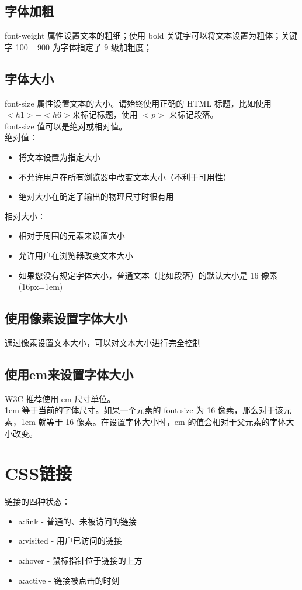 \documentclass[10pt,UTF8]{ctexart}
\begin{document}
\subsection{字体加粗}
font-weight 属性设置文本的粗细；使用 bold 关键字可以将文本设置为粗体；关键字 100 ~ 900 为字体指定了 9 级加粗度；
\subsection{字体大小}
font-size 属性设置文本的大小。请始终使用正确的 HTML 标题，比如使用 $<h1> - <h6>$来标记标题，使用 $<p>$ 来标记段落。\\
font-size 值可以是绝对或相对值。\\
绝对值：
\begin{itemize}
\item 将文本设置为指定大小
\item 不允许用户在所有浏览器中改变文本大小（不利于可用性）
\item 绝对大小在确定了输出的物理尺寸时很有用
\end{itemize}
相对大小：
\begin{itemize}
\item 相对于周围的元素来设置大小
\item 允许用户在浏览器改变文本大小
\item 如果您没有规定字体大小，普通文本（比如段落）的默认大小是 16 像素 (16px=1em)
\end{itemize}
\subsection{使用像素设置字体大小}
通过像素设置文本大小，可以对文本大小进行完全控制
\subsection{使用em来设置字体大小}
W3C 推荐使用 em 尺寸单位。\\
1em 等于当前的字体尺寸。如果一个元素的 font-size 为 16 像素，那么对于该元素，1em 就等于 16 像素。在设置字体大小时，em 的值会相对于父元素的字体大小改变。

\section{CSS链接}
链接的四种状态：
\begin{itemize}
\item a:link - 普通的、未被访问的链接
\item a:visited - 用户已访问的链接
\item a:hover - 鼠标指针位于链接的上方
\item a:active - 链接被点击的时刻
\end{itemize}
\end{document}
